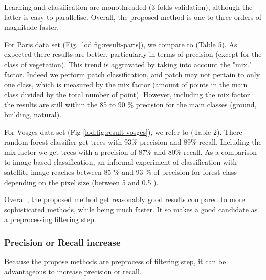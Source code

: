 		  
		  Learning and classification are monothreaded (3 folds validation), although the latter is easy to parallelise.
		  Overall, the proposed method is one to three orders of magnitude faster.
		  
		  For Paris data set (Fig. \ref{lod.fig:result-paris}), we compare to \cite{Weinmann2015}(Table 5). As expected there results are better, particularly in terms of precision (except for the class of vegetation). This trend is aggravated by taking into account the "mix." factor.
		  Indeed we perform patch classification, and patch may not pertain to only one class, which is measured by the mix factor (amount of points in the main class divided by the total number of point).
		  However, including the mix factor the results are still within the 85 to 90 \% precision for the main classes (ground, building, natural).
		  
		  For Vosges data set (Fig \ref{lod.fig:result-vosges}), we refer to \cite{shapovalov2010} (Table 2). There random forest classifier get trees with 93\% precision and  89\% recall.
		  Including the mix factor we get trees with a precision of 87\% and 80\% recall.
		  As a comparison to image based classification, an informal experiment of classification with satellite image reaches between 85 \% and 93 \% of precision for forest class depending on the pixel size (between 5 and 0.5 \metre).
		  
		  Overall, the proposed method get reasonably good results compared to more sophisticated methods,
		  while being much faster.
		  It so makes a good candidate as a preprocessing filtering step.
		  
	 \subsubsection{Precision or Recall increase}
	 Because the propose methods are preprocess of filtering step, it can be advantageous to increase precision or recall.
		

